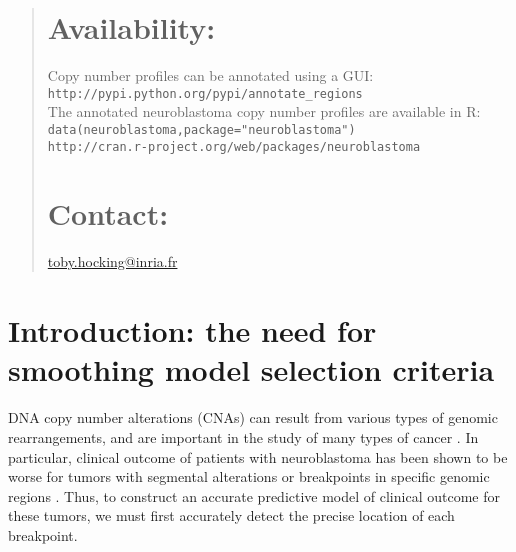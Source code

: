 \documentclass{bioinfo}
\newcommand{\code}[1]{\texttt{#1}}
\begin{document}
\begin{abstract}
\section{Availability:}
Copy number profiles can be annotated using a GUI:\\
\verb+http://pypi.python.org/pypi/annotate_regions+\\
The annotated neuroblastoma copy number profiles
are available in R: \code{data(neuroblastoma,package="neuroblastoma")}\\
\verb+http://cran.r-project.org/web/packages/neuroblastoma+

\section{Contact:}
 \href{mailto:toby.hocking@inria.fr}{toby.hocking@inria.fr}
\end{abstract}

\section{Introduction: the need for smoothing model selection
  criteria}

DNA copy number alterations (CNAs) can result from various types of
genomic rearrangements, and are important in the study of many types
of cancer \citep{weinberg}. In particular, clinical outcome of
patients with neuroblastoma has been shown to be worse for tumors with
segmental alterations or breakpoints in specific genomic regions
\citep{isabelle-2009,gudrun-jclinicaloncology}.  Thus, to construct an
accurate predictive model of clinical outcome for these tumors, we
must first accurately detect the precise location of each breakpoint.
\end{document}
